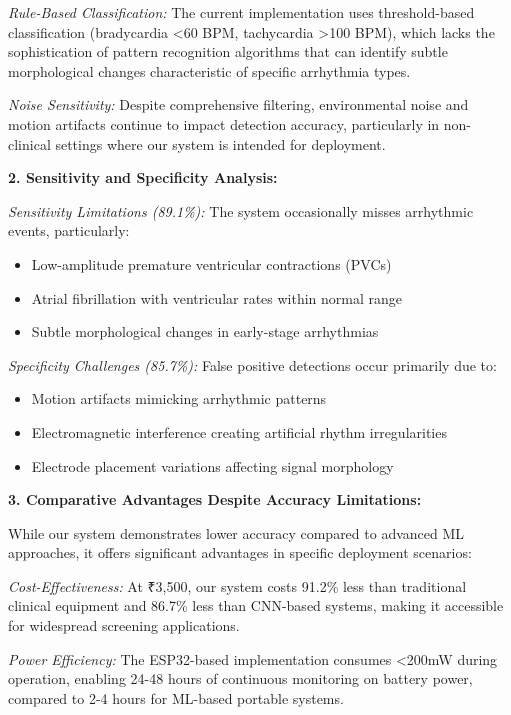 \documentclass[12pt,a4paper]{article}
\begin{document}
\textit{Rule-Based Classification:} The current implementation uses threshold-based classification (bradycardia <60 BPM, tachycardia >100 BPM), which lacks the sophistication of pattern recognition algorithms that can identify subtle morphological changes characteristic of specific arrhythmia types.

\textit{Noise Sensitivity:} Despite comprehensive filtering, environmental noise and motion artifacts continue to impact detection accuracy, particularly in non-clinical settings where our system is intended for deployment.

\vspace{0.5cm}

\textbf{2. Sensitivity and Specificity Analysis:}

\textit{Sensitivity Limitations (89.1\%):} The system occasionally misses arrhythmic events, particularly:
\begin{itemize}
\item Low-amplitude premature ventricular contractions (PVCs)
\item Atrial fibrillation with ventricular rates within normal range
\item Subtle morphological changes in early-stage arrhythmias
\end{itemize}

\textit{Specificity Challenges (85.7\%):} False positive detections occur primarily due to:
\begin{itemize}
\item Motion artifacts mimicking arrhythmic patterns
\item Electromagnetic interference creating artificial rhythm irregularities
\item Electrode placement variations affecting signal morphology
\end{itemize}

\vspace{0.5cm}

\textbf{3. Comparative Advantages Despite Accuracy Limitations:}

While our system demonstrates lower accuracy compared to advanced ML approaches, it offers significant advantages in specific deployment scenarios:

\textit{Cost-Effectiveness:} At ₹3,500, our system costs 91.2\% less than traditional clinical equipment and 86.7\% less than CNN-based systems, making it accessible for widespread screening applications.

\textit{Power Efficiency:} The ESP32-based implementation consumes <200mW during operation, enabling 24-48 hours of continuous monitoring on battery power, compared to 2-4 hours for ML-based portable systems.
\end{document}
